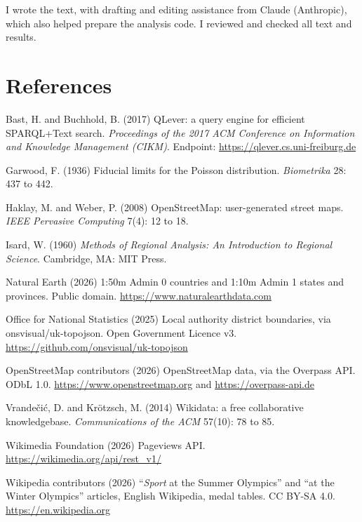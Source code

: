 \documentclass[11pt,a4paper]{article}
\begin{document}
I wrote the text, with drafting and editing assistance from Claude (Anthropic), which also helped prepare the analysis code. I reviewed and checked all text and results.

\section*{References}
\small
Bast, H. and Buchhold, B. (2017) QLever: a query engine for efficient SPARQL+Text search. \emph{Proceedings of the 2017 ACM Conference on Information and Knowledge Management (CIKM)}. Endpoint: \url{https://qlever.cs.uni-freiburg.de}

Garwood, F. (1936) Fiducial limits for the Poisson distribution. \emph{Biometrika} 28: 437 to 442.

Haklay, M. and Weber, P. (2008) OpenStreetMap: user-generated street maps. \emph{IEEE Pervasive Computing} 7(4): 12 to 18.

Isard, W. (1960) \emph{Methods of Regional Analysis: An Introduction to Regional Science}. Cambridge, MA: MIT Press.

Natural Earth (2026) 1:50m Admin 0 countries and 1:10m Admin 1 states and provinces. Public domain. \url{https://www.naturalearthdata.com}

Office for National Statistics (2025) Local authority district boundaries, via onsvisual/uk-topojson. Open Government Licence v3. \url{https://github.com/onsvisual/uk-topojson}

OpenStreetMap contributors (2026) OpenStreetMap data, via the Overpass API. ODbL 1.0. \url{https://www.openstreetmap.org} and \url{https://overpass-api.de}

Vrandečić, D. and Krötzsch, M. (2014) Wikidata: a free collaborative knowledgebase. \emph{Communications of the ACM} 57(10): 78 to 85.

Wikimedia Foundation (2026) Pageviews API. \url{https://wikimedia.org/api/rest_v1/}

Wikipedia contributors (2026) ``\emph{Sport} at the Summer Olympics'' and ``at the Winter Olympics'' articles, English Wikipedia, medal tables. CC BY-SA 4.0. \url{https://en.wikipedia.org}
\end{document}
